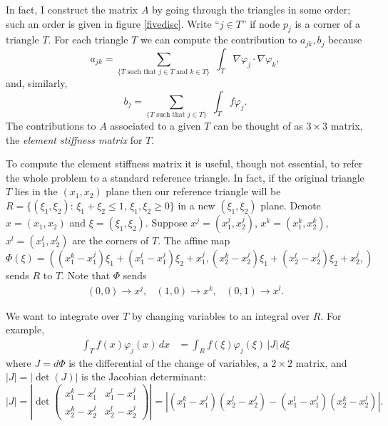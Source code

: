 \documentclass[12pt]{amsart}
\theoremstyle{definition}
\newcommand{\grad}{\nabla}
\newcommand{\vf}{\varphi}
\begin{document}
In fact, I construct the matrix $A$ by going through the triangles in some order; such an order is given in figure \ref{fivedisc}.  Write ``$j\in T$'' if node $p_j$ is a corner of a triangle $T$.  For each triangle $T$ we can compute the contribution to $a_{jk},b_j$ because
    $$a_{jk} = \sum_{\{T \text{ such that } j\in T \text{ and } k\in T\}} \,\,\int_T \grad \vf_j \cdot \grad \vf_k,$$
and, similarly, 
\begin{equation}\label{loadcontrib}
b_j = \sum_{\{T \text{ such that } j\in T\}} \,\,\int_T f \vf_j.
\end{equation}
The contributions to $A$ associated to a given $T$ can be thought of as $3\times 3$ matrix, the \emph{element stiffness matrix} \cite[equation (1.27)]{Johnson} for $T$.

To compute the element stiffness matrix it is useful, though not essential, to refer the whole problem to a standard reference triangle.  In fact, if the original triangle $T$ lies in the $(x_1,x_2)$ plane then our reference triangle will be $R = \{(\xi_1,\xi_2) : \,\xi_1+\xi_2\le 1, \,\xi_1, \xi_2 \ge 0\}$ in a new $(\xi_1,\xi_2)$ plane.  Denote $x=(x_1,x_2)$ and $\xi=(\xi_1,\xi_2)$.  Suppose $x^j=(x_1^j,x_2^j)$, $x^k=(x_1^k,x_2^k)$, $x^l=(x_1^l,x_2^l)$ are the corners of $T$.  The affine map
    $$\Phi(\xi) = \left((x_1^k-x_1^j)\xi_1+(x_1^l-x_1^j)\xi_2 + x_1^j, (x_2^k-x_2^j)\xi_1+(x_2^l-x_2^j)\xi_2 + x_2^j,\right)$$
sends $R$ to $T$.  Note that $\Phi$ sends
    $$\begin{matrix} (0,0) \to x^j, & (1,0) \to x^k, & (0,1) \to x^l.\end{matrix}$$

We want to integrate over $T$ by changing variables to an integral over $R$.  For example,
\begin{align*}
\int_T f(x) \vf_j(x)\,dx &= \int_R f(\xi) \vf_j(\xi) \, |J|\, d\xi
\end{align*}
where $J=d\Phi$ is the differential of the change of variables, a $2\times 2$ matrix, and $|J|=|\det(J)|$ is the Jacobian determinant:
    $$|J| = \left|\det \begin{pmatrix} x_1^k-x_1^j & x_1^l-x_1^j \\ x_2^k-x_2^j & x_2^l-x_2^j\end{pmatrix}\right| = |(x_1^k-x_1^j)(x_2^l-x_2^j)-(x_1^l-x_1^j)(x_2^k-x_2^j)|.$$
\end{document}

